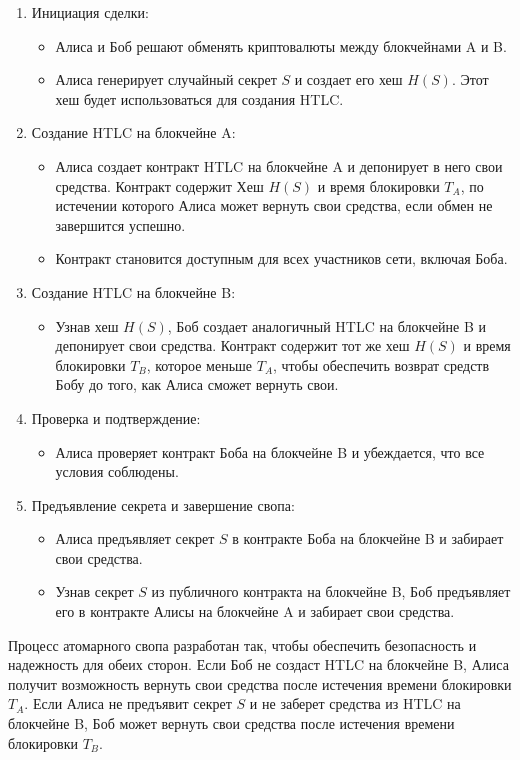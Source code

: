 \begin{enumerate}
\item Инициация сделки:
	\begin{itemize}
	\item Алиса и Боб решают обменять криптовалюты между блокчейнами A и B.
	\item Алиса генерирует случайный секрет $ S $ и создает его хеш $ H(S) $. Этот хеш будет использоваться для создания HTLC.
	\end{itemize}
\item Создание HTLC на блокчейне A:
	\begin{itemize}
	\item Алиса создает контракт HTLC на блокчейне A и депонирует в него свои средства. Контракт содержит Хеш $ H(S) $ и время блокировки $ T_A $, по истечении которого Алиса может вернуть свои средства, если обмен не завершится успешно.
    \item Контракт становится доступным для всех участников сети, включая Боба.
	\end{itemize}
\item Создание HTLC на блокчейне B:
	\begin{itemize}
	\item Узнав хеш $ H(S) $, Боб создает аналогичный HTLC на блокчейне B и депонирует свои средства. Контракт содержит тот же хеш $ H(S) $ и время блокировки $ T_B $, которое меньше $ T_A $, чтобы обеспечить возврат средств Бобу до того, как Алиса сможет вернуть свои.
	\end{itemize}
\item Проверка и подтверждение:
	\begin{itemize}
	\item Алиса проверяет контракт Боба на блокчейне B и убеждается, что все условия соблюдены.
	\end{itemize}
\item Предъявление секрета и завершение свопа:
	\begin{itemize}
	\item Алиса предъявляет секрет $ S $ в контракте Боба на блокчейне B и забирает свои средства.
	\item Узнав секрет $ S $ из публичного контракта на блокчейне B, Боб предъявляет его в контракте Алисы на блокчейне A и забирает свои средства.
	\end{itemize}
\end{enumerate}

Процесс атомарного свопа разработан так, чтобы обеспечить безопасность и надежность для обеих сторон. Если Боб не создаст HTLC на блокчейне B, Алиса получит возможность вернуть свои средства после истечения времени блокировки $ T_A $. Если Алиса не предъявит секрет $ S $ и не заберет средства из HTLC на блокчейне B, Боб может вернуть свои средства после истечения времени блокировки $ T_B $.

